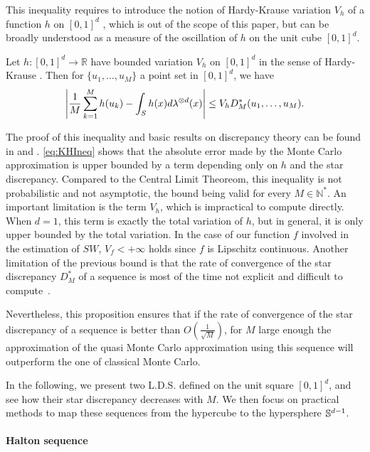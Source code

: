 This inequality requires to introduce the notion of Hardy-Krause variation $V_h$ of a function $h$ on $[0,1]^d$ \citep{aistleitner2016functions}, which is out of the scope of this paper, but can be broadly understood as a measure of the oscillation of $h$ on the unit cube $[0,1]^d$.
\begin{Prop}
Let {$h:[0,1]^d \rightarrow \mathbb{R}$} have bounded variation $V_h$ on {$[0,1]^d$} in the sense of Hardy-Krause \citep{aistleitner2016functions}. Then for $\{u_1,\hdots,u_M\}$ a point set in {$[0,1]^d$}, we have
\begin{equation}\label{eq:KHIneq}
\Bigg |\frac{1}{M}\displaystyle\sum\limits_{k=1}^M h(u_k) - \displaystyle\int_{S} h(x)d\lambda^{\otimes d}(x) \Bigg | \leq V_h D_M^*(u_1,\hdots,u_M).
\end{equation}
\end{Prop}
\noindent The proof of this inequality and basic results on discrepancy theory can be found in\citep{kuipers2012uniform} and \citep{dick2010digital}. \autoref{eq:KHIneq} shows that the absolute error made {by the Monte Carlo approximation} is {upper} bounded {by a term depending only on $h$} and the star discrepancy. Compared to the Central Limit Theoreom, this inequality is not probabilistic and not asymptotic, the bound being valid for every $M \in \mathbb{N}^*$.  An important limitation is the term $V_h$, which is impractical to compute directly. When $d = 1$, this term is exactly the total variation of $h$, but in general, it is only {upper} bounded by the total variation. 
In the case of our function $f$ involved in the estimation of $SW$, $V_f < +\infty$ holds since $f$  is Lipschitz continuous. Another limitation of the previous bound is that the rate of convergence of the star discrepancy $D_M^*$ of a sequence is most of the time not explicit and difficult to compute~\citep{owen2005multidimensional}. 

Nevertheless, this proposition ensures that if the rate of convergence of the star discrepancy of a sequence is better than $O(\frac 1 {\sqrt{M}})$, for $M$ large enough the approximation of the quasi Monte Carlo approximation using this sequence will outperform the one of classical Monte Carlo. 

{In the following, we present two L.D.S. defined on the unit square $[0,1]^d$, and see how their star discrepancy decreases with $M$. We then focus on practical methods to map these sequences from the hypercube to the hypersphere $\mathbb{S}^{d-1}$.}

\paragraph{Halton sequence} \label{par:Halton}\mbox{} \\

